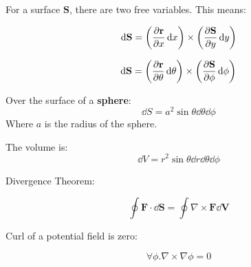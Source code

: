 \documentclass[10pt, a4paper]{article}
\begin{document}
For a surface $\mathbf{S}$, there are two free variables. This means:

\[
\dd{\mathbf{S}} = \left(\pdv{\mathbf{r}}{x}\dd{x}\right)\times \left(\pdv{\mathbf{S}}{y}\dd{y}\right)
\]

\[
\dd{\mathbf{S}} = \left(\pdv{\mathbf{r}}{\theta}\dd{\theta}\right)\times \left(\pdv{\mathbf{S}}{\phi}\dd{\phi}\right)
\]

Over the surface of a \textbf{sphere}:
\[
\dd{S} = a^2\sin\theta\dd{\theta}\dd{\phi}
\]
Where $a$ is the radius of the sphere.

The volume is:
\[
\dd{V} = r^2\sin\theta\dd{r}\dd{\theta}\dd{\phi}
\]

Divergence Theorem:

\[
\oint \mathbf{F} \cdot \dd{\mathbf{S}} = \oint \nabla \times \mathbf{F} \dd{\mathbf{V}}
\]

Curl of a potential field is zero:

\[
\forall \phi. \nabla \times \nabla \phi = 0
\]
\end{document}
